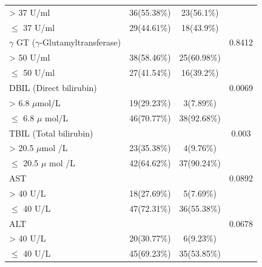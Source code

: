 \documentclass[num-refs]{wiley-article}
\begin{document}
\begin{table}[]
\begin{center}
\begin{tabular}{|l|c|c|c|}
\quad \textgreater{} 37 U/ml                          & 36(55.38\%)  & 23(56.1\%)  &                         \\ \cline{1-3}
\quad $\leq$ 37 U/ml                                       & 29(44.61\%)  & 18(43.9\%)  &                         \\ \hline
$\gamma$ GT ($\gamma$-Glutamyltransferase)                  &              &             & 0.8412 \\ \cline{1-3}
\quad \textgreater{} 50 U/ml                          & 38(58.46\%)  & 25(60.98\%) &                         \\ \cline{1-3}
\quad $\leq$ 50 U/ml                                       & 27(41.54\%)  & 16(39.2\%)  &                         \\ \hline
DBIL (Direct   bilirubin)                      &              &             & 0.0069 \\ \cline{1-3}
\quad \textgreater{} 6.8 $\mu$mol/L                       & 19(29.23\%)  & 3(7.89\%)   &                         \\ \cline{1-3}
\quad $\leq$ 6.8 $\mu$ mol/L                                    & 46(70.77\%)  & 38(92.68\%) &                         \\ \hline
TBIL (Total   bilirubin)                       &              &             & 0.003  \\ \cline{1-3}
\quad \textgreater{} 20.5 $\mu$mol /L                     & 23(35.38\%)  & 4(9.76\%)   &                         \\ \cline{1-3}
\quad $\leq$ 20.5 $\mu$ mol /L                                  & 42(64.62\%)  & 37(90.24\%) &                         \\ \hline
AST                                            &              &             & 0.0892 \\ \cline{1-3}
\quad \textgreater{} 40 U/L                           & 18(27.69\%)  & 5(7.69\%)   &                         \\ \cline{1-3}
\quad $\leq$ 40 U/L                                        & 47(72.31\%)  & 36(55.38\%) &                         \\ \hline
ALT                                            &              &             & 0.0678 \\ \cline{1-3}
\quad \textgreater{} 40 U/L                           & 20(30.77\%)  & 6(9.23\%)   &                         \\ \cline{1-3}
\quad $\leq$ 40 U/L                                        & 45(69.23\%)  & 35(53.85\%) &                         \\ \hline

\end{tabular}
\end{center}
\end{table}
\end{document}
